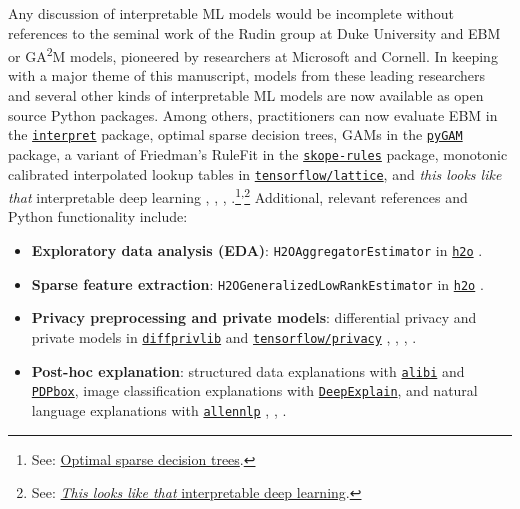 \documentclass[information,article,submit,moreauthors,pdftex]{definitions/mdpi}
\begin{document}
{Any discussion of interpretable ML models would be incomplete without references to the seminal work of the Rudin group at Duke University and EBM or GA\textsuperscript{2}M models, pioneered by researchers at Microsoft and Cornell. In keeping with a major theme of this manuscript, models from these leading researchers and several other kinds of interpretable ML models are now available as open source Python packages. Among others, practitioners can now evaluate EBM in the \href{https://github.com/interpretml/interpret}{\texttt{interpret}} package, optimal sparse decision trees, GAMs in the \href{https://github.com/dswah/pyGAM}{\texttt{pyGAM}} package, a variant of Friedman's RuleFit  in the \href{https://github.com/scikit-learn-contrib/skope-rules}{\texttt{skope-rules}} package, monotonic calibrated interpolated lookup tables in \href{https://github.com/tensorflow/lattice}{\texttt{tensorflow/lattice}}, and \textit{this looks like that} interpretable deep learning \cite{osdt}, \cite{rulefit}, \cite{lattice}, \cite{this_looks_like_that}.\footnote{See: \href{https://github.com/xiyanghu/OSDT}{Optimal sparse decision trees}.}\textsuperscript{,}\footnote{See: \href{https://github.com/cfchen-duke/ProtoPNet}{\textit{This looks like that} interpretable deep learning}.} Additional, relevant references and Python functionality include:

\begin{itemize}[leftmargin=*,labelsep=5.8mm]

\item \textbf{Exploratory data analysis (EDA)}: \texttt{H2OAggregatorEstimator} in \href{http://docs.h2o.ai/h2o/latest-stable/h2o-py/docs/modeling.html#h2oaggregatorestimator}{\texttt{h2o}} \cite{wilkinson2018visualizing}.

\item \textbf{Sparse feature extraction}: \texttt{H2OGeneralizedLowRankEstimator} in \href{http://docs.h2o.ai/h2o/latest-stable/h2o-py/docs/modeling.html#h2ogeneralizedlowrankestimator}{\texttt{h2o}} \cite{udell2016generalized}.

\item \textbf{Privacy preprocessing and private models}: differential privacy and private models in \href{https://github.com/IBM/differential-privacy-library}{\texttt{diffprivlib}} and \href{https://github.com/tensorflow/privacy/}{\texttt{tensorflow/privacy}} \cite{diffprivlib}, \cite{ji2014differential}, \cite{pate}, \cite{abadi2016deep}.

\item \textbf{Post-hoc explanation}: structured data explanations with \href{https://github.com/SeldonIO/alibi}{\texttt{alibi}} and \href{https://github.com/SauceCat/PDPbox}{\texttt{PDPbox}}, image classification explanations with \href{https://github.com/marcoancona/DeepExplain}{\texttt{DeepExplain}}, and natural language explanations with \href{https://github.com/allenai/allennlp}{\texttt{allennlp}} \cite{wachter2017counterfactual}, \cite{grad_attr}, \cite{wallace2019allennlp}. 


\end{itemize}}
\end{document}
